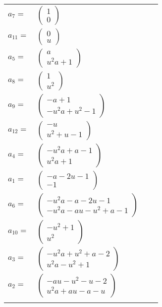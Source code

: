 \documentclass[1p]{elsarticle_modified}
\theoremstyle{definition}
\begin{document}
\begin{tabular}{m{7pt} m{180pt} m{7pt} m{180pt} }
\flushright $a_{7}=$&$\begin{pmatrix}1\\0\end{pmatrix}$ \\
\flushright $a_{11}=$&$\begin{pmatrix}0\\u\end{pmatrix}$ \\
\flushright $a_{5}=$&$\begin{pmatrix}a\\u^2 a+1\end{pmatrix}$ \\
\flushright $a_{8}=$&$\begin{pmatrix}1\\u^2\end{pmatrix}$ \\
\flushright $a_{9}=$&$\begin{pmatrix}- a+1\\- u^2 a+u^2-1\end{pmatrix}$ \\
\flushright $a_{12}=$&$\begin{pmatrix}- u\\u^2+u-1\end{pmatrix}$ \\
\flushright $a_{4}=$&$\begin{pmatrix}- u^2 a+a-1\\u^2 a+1\end{pmatrix}$ \\
\flushright $a_{1}=$&$\begin{pmatrix}- a-2 u-1\\-1\end{pmatrix}$ \\
\flushright $a_{6}=$&$\begin{pmatrix}- u^2 a- a-2 u-1\\- u^2 a- a u- u^2+a-1\end{pmatrix}$ \\
\flushright $a_{10}=$&$\begin{pmatrix}- u^2+1\\u^2\end{pmatrix}$ \\
\flushright $a_{3}=$&$\begin{pmatrix}- u^2 a+u^2+a-2\\u^2 a- u^2+1\end{pmatrix}$ \\
\flushright $a_{2}=$&$\begin{pmatrix}- a u- u^2- u-2\\u^2 a+a u- a- u\end{pmatrix}$\\&\end{tabular}
\end{document}
